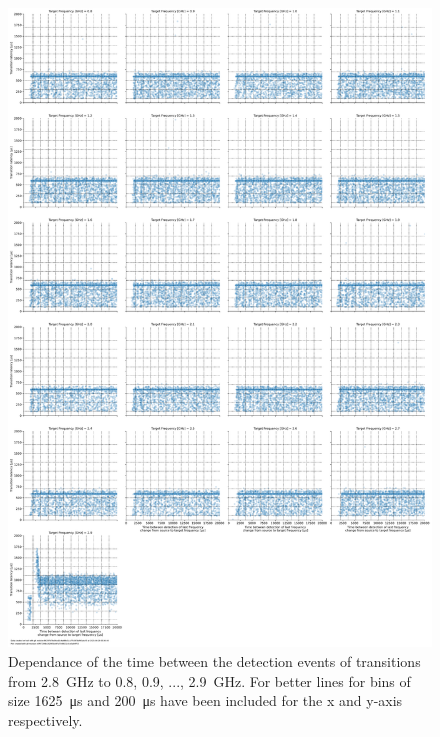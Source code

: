 \begin{figure}[]
    \centering
    \includegraphics[width=\columnwidth]{fig/ftalat/ftalat_scatter_wait_transition_latency_hati_source_2.8.pdf}
    \caption{Dependance of the time between the detection events of transitions from \SI{2.8}{\GHz} to \SI{0.8}{}, \SI{0.9}{}, ..., \SI{2.9}{\GHz}. For better lines for bins of size \SI{1625}{\us} and \SI{200}{\us} have been included for the x and y-axis respectively.}
\end{figure}
